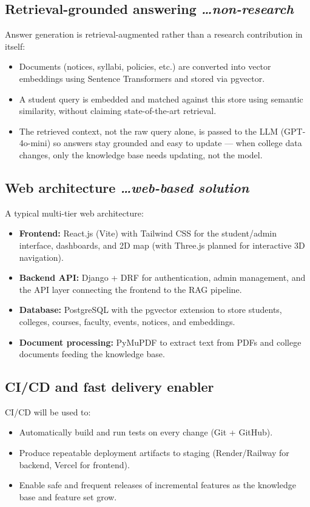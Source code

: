 \documentclass[11pt,a4paper]{article}
\newcommand{\BvrHint}[1]{%
  {\normalfont\normalsize\itshape\hfill #1}}
\begin{document}
\subsection{Retrieval-grounded answering %
\BvrHint{\ldots non-research}}
Answer generation is retrieval-augmented rather than a research
contribution in itself:
\begin{itemize}[leftmargin=0.7cm]
    \item Documents (notices, syllabi, policies, etc.) are converted into vector embeddings using Sentence Transformers and stored via pgvector.
    \item A student query is embedded and matched against this store using semantic similarity, without claiming state-of-the-art retrieval.
    \item The retrieved context, not the raw query alone, is passed to the LLM (GPT-4o-mini) so answers stay grounded and easy to update --- when college data changes, only the knowledge base needs updating, not the model.
\end{itemize}

\subsection{Web architecture %
\BvrHint{\ldots web-based solution}}
A typical multi-tier web architecture:
\begin{itemize}[leftmargin=0.7cm]
    \item \textbf{Frontend:} React.js (Vite) with Tailwind CSS for the student/admin interface, dashboards, and 2D map (with Three.js planned for interactive 3D navigation).
    \item \textbf{Backend API:} Django + DRF for authentication, admin management, and the API layer connecting the frontend to the RAG pipeline.
    \item \textbf{Database:} PostgreSQL with the pgvector extension to store students, colleges, courses, faculty, events, notices, and embeddings.
    \item \textbf{Document processing:} PyMuPDF to extract text from PDFs and college documents feeding the knowledge base.
\end{itemize}

\subsection{CI/CD and fast delivery enabler}
CI/CD will be used to:
\begin{itemize}[leftmargin=0.7cm]
    \item Automatically build and run tests on every change (Git + GitHub).
    \item Produce repeatable deployment artifacts to staging (Render/Railway for backend, Vercel for frontend).
    \item Enable safe and frequent releases of incremental features as the knowledge base and feature set grow.
\end{itemize}
\end{document}

